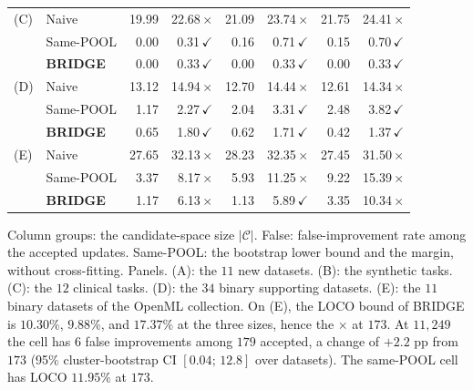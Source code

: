\begin{table}[!htb]
\begin{tabular}{@{}llrrrrrr@{}}
\addlinespace
(C) & Naive & 19.99 & 22.68\,$\times$ & 21.09 & 23.74\,$\times$ & 21.75 & 24.41\,$\times$ \\
 & Same-POOL & 0.00 & 0.31\,$\checkmark$ & 0.16 & 0.71\,$\checkmark$ & 0.15 & 0.70\,$\checkmark$ \\
 & \textbf{BRIDGE} & 0.00 & 0.33\,$\checkmark$ & 0.00 & 0.33\,$\checkmark$ & 0.00 & 0.33\,$\checkmark$ \\
\addlinespace
(D) & Naive & 13.12 & 14.94\,$\times$ & 12.70 & 14.44\,$\times$ & 12.61 & 14.34\,$\times$ \\
 & Same-POOL & 1.17 & 2.27\,$\checkmark$ & 2.04 & 3.31\,$\checkmark$ & 2.48 & 3.82\,$\checkmark$ \\
 & \textbf{BRIDGE} & 0.65 & 1.80\,$\checkmark$ & 0.62 & 1.71\,$\checkmark$ & 0.42 & 1.37\,$\checkmark$ \\
\addlinespace
(E) & Naive & 27.65 & 32.13\,$\times$ & 28.23 & 32.35\,$\times$ & 27.45 & 31.50\,$\times$ \\
 & Same-POOL & 3.37 & 8.17\,$\times$ & 5.93 & 11.25\,$\times$ & 9.22 & 15.39\,$\times$ \\
 & \textbf{BRIDGE} & 1.17 & 6.13\,$\times$ & 1.13 & 5.89\,$\checkmark$ & 3.35 & 10.34\,$\times$ \\
\bottomrule
\end{tabular}

\vspace{2pt}
\parbox{\linewidth}{\justifying\scriptsize *Column groups: the candidate-space size $|\mathcal{C}|$. False: false-improvement rate among the accepted updates. Same-POOL: the bootstrap lower bound and the margin, without cross-fitting. Panels. (A): the $11$ new datasets. (B): the synthetic tasks. (C): the $12$ clinical tasks. (D): the $34$ binary supporting datasets. (E): the $11$ binary datasets of the OpenML collection. On (E), the LOCO bound of BRIDGE is $10.30\%$, $9.88\%$, and $17.37\%$ at the three sizes, hence the $\times$ at $173$. At $11{,}249$ the cell has $6$ false improvements among $179$ accepted, a change of $+2.2$ pp from $173$ (95\% cluster-bootstrap CI $[0.04;\,12.8]$ over datasets). The same-POOL cell has LOCO $11.95\%$ at $173$.}
\end{table}
